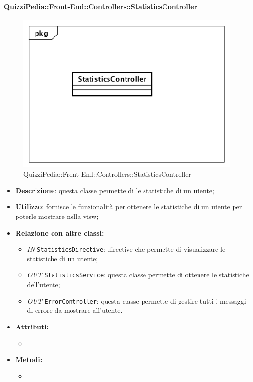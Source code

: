 \paragraph{QuizziPedia::Front-End::Controllers::StatisticsController}
\begin{figure}
	\centering
	\includegraphics[scale=0.45]{UML/Classi/Front-End/QuizziPedia_Front-end_Controller_StatisticsController.png}
	\caption{QuizziPedia::Front-End::Controllers::StatisticsController}
\end{figure}
\begin{itemize}
	\item \textbf{Descrizione}: questa classe permette di le statistiche di un utente;
	\item \textbf{Utilizzo}: fornisce le funzionalità per ottenere le statistiche di un utente per poterle mostrare nella view;
	\item \textbf{Relazione con altre classi:}
	\begin{itemize}
		\item \textit{IN} \texttt{StatisticsDirective}: directive che permette di visualizzare le statistiche di un utente; 
		\item \textit{OUT} \texttt{StatisticsService}: questa classe permette di ottenere le statistiche dell'utente;
		\item \textit{OUT} \texttt{ErrorController}: questa classe permette di gestire tutti i messaggi di errore da mostrare all'utente.
	\end{itemize}
	\item \textbf{Attributi:}
	\begin{itemize}
		\item 
	\end{itemize}
	\item \textbf{Metodi:}
	\begin{itemize}
		\item 
	\end{itemize}
\end{itemize}

